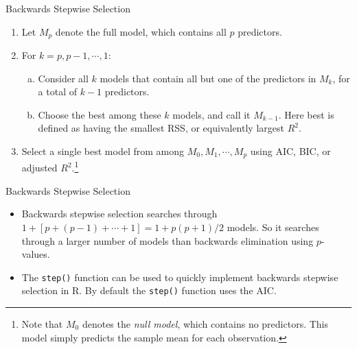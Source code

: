 \documentclass[10pt]{beamer}\usepackage[]{graphicx}\usepackage[]{color}
\begin{document}
\begin{frame}{Backwards Stepwise Selection}
\begin{enumerate}
\item Let $M_p$ denote the full model, which contains all $p$ predictors.
\vspace{5pt}
\item For $k=p,p-1,\cdots,1$:
\begin{enumerate}[(a)]
\item Consider all $k$ models that contain all but one of the predictors in $M_k$, for a total of $k-1$ predictors.
\item Choose the best among these $k$ models, and call it $M_{k-1}$.  Here best is defined as having the smallest RSS, or equivalently largest $R^2$.
\end{enumerate}
\vspace{5pt}
\item Select a single best model from among $M_0, M_1, \cdots, M_p$ using AIC, BIC, or adjusted $R^2$.\footnote{Note that $M_0$ denotes the \emph{null model}, which contains no predictors.  This model simply predicts the sample mean for each observation.}
\end{enumerate}
\end{frame}

\begin{frame}{Backwards Stepwise Selection}
\begin{itemize}
\item Backwards stepwise selection searches through $1 + [p + (p-1) + \cdots + 1] = 1 + p(p+1)/2$ models.  So it searches through a larger number of models than backwards elimination using $p$-values.
\vspace{10pt}
\item The \texttt{step()} function can be used to quickly implement backwards stepwise selection in R.  By default the \texttt{step()} function uses the AIC.  
\end{itemize}
\end{frame}
\end{document}
